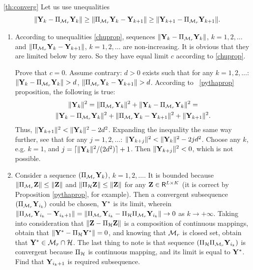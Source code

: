 \documentclass[12pt,a4paper,fleqn,leqno]{article}
\begin{document}
\begin{proof2}{\ref{th:converg}}
Let us use unequalities \cite{Chu.etal2003}
\begin{equation}
\label{chuprop}
\|\mathbf{Y}_k - \Pi_{\mathcal{M}_r} \mathbf{Y}_k\| \ge \|\Pi_{\mathcal{M}_r} \mathbf{Y}_k - \mathbf{Y}_{k + 1}\| \ge \|\mathbf{Y}_{k+1} - \Pi_{\mathcal{M}_r} \mathbf{Y}_{k + 1}\|.
\end{equation}

\begin{enumerate}
\item According to unequalities \eqref{chuprop}, sequences $\|\mathbf{Y}_k - \Pi_{\mathcal{M}_r} \mathbf{Y}_k\|$, $k = 1, 2, \ldots$ and $\|\Pi_{\mathcal{M}_r} \mathbf{Y}_k - \mathbf{Y}_{k + 1}\|$, $k = 1, 2, \ldots$ are non-increasing. It is obvious that they are limited below by zero. So they have equal limit $c$ according to \eqref{chuprop}.

Prove that $c = 0$. Assume contrary: $d > 0$ exists such that for any $k = 1, 2, \ldots$: $\|\mathbf{Y}_k - \Pi_{\mathcal{M}_r} \mathbf{Y}_k\| > d$, $\|\Pi_{\mathcal{M}_r} \mathbf{Y}_k - \mathbf{Y}_{k + 1}\| > d$. According to ~\ref{pythaprop} proposition, the following is true:
\begin{gather*}
\|\mathbf{Y}_k\|^2 = \|\Pi_{\mathcal{M}_r} \mathbf{Y}_k\|^2 + \|\mathbf{Y}_k - \Pi_{\mathcal{M}_r} \mathbf{Y}_k\|^2 =\\ \|\mathbf{Y}_k - \Pi_{\mathcal{M}_r} \mathbf{Y}_k\|^2 + \|\Pi_{\mathcal{M}_r} \mathbf{Y}_k - \mathbf{Y}_{k + 1}\|^2 + \|\mathbf{Y}_{k + 1}\|^2.
\end{gather*}
Thus, $\|\mathbf{Y}_{k+1}\|^2 < \|\mathbf{Y}_k\|^2 - 2d^2$. Expanding the inequality the same way further, see that for any $j = 1, 2, \ldots$: $\|\mathbf{Y}_{k+j}\|^2 < \|\mathbf{Y}_k\|^2 - 2 j d^2$. Choose any $k$, e.g. $k = 1$, and $j = \lceil \|\mathbf{Y}_k\|^2 / (2d^2) \rceil + 1$. Then $\|\mathbf{Y}_{k+j}\|^2 < 0$, which is not possible.
\item Consider a sequence $(\Pi_{\mathcal{M}_r} \mathbf{Y}_k)$, $k = 1, 2, \ldots$. It is bounded because $\|\Pi_{\mathcal{M}_r} \mathbf{Z}\| \le \|\mathbf{Z}\|$ and $\|\Pi_{\mathcal{H}} \mathbf{Z}\| \le \|\mathbf{Z}\|$ for any $\mathbf{Z} \in \mathsf{R}^{L \times K}$ (it is correct by Proposition \ref{pythaprop}, for example). Then a convergent subsequence $(\Pi_{\mathcal{M}_r} \mathbf{Y}_{i_k})$ could be chosen, $\mathbf{Y}^*$ is its limit, wherein $\|\Pi_{\mathcal{M}_r} \mathbf{Y}_{i_k} - \mathbf{Y}_{i_k + 1}\| = \|\Pi_{\mathcal{M}_r} \mathbf{Y}_{i_k} - \Pi_{\mathcal{H}} \Pi_{\mathcal{M}_r} \mathbf{Y}_{i_k}\| \to 0$ as $k \to + \infty$. Taking into consideration that $\|\mathbf{Z} - \Pi_{\mathcal{H}} \mathbf{Z}\|$ is a composition of continuous mappings, obtain that $\|\mathbf{Y}^* - \Pi_{\mathcal{H}} \mathbf{Y}^*\| = 0$, and knowing that $\mathcal{M}_r$ is closed set, obtain that $\mathbf{Y}^* \in \mathcal{M}_r \cap \mathcal{H}$. The last thing to note is that sequence $(\Pi_{\mathcal{H}} \Pi_{\mathcal{M}_r} \mathbf{Y}_{i_k})$ is convergent because $\Pi_{\mathcal{H}}$ is continuous mapping, and its limit is equal to $\mathbf{Y}^*$. Find that $\mathbf{Y}_{i_k + 1}$ is required subsequence.
\end{enumerate}
\end{proof2}
\end{document}
